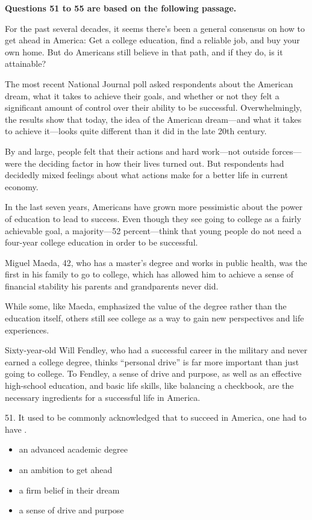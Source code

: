 \documentclass[UTF8,11pt]{ctexart}
\begin{document}
\textbf{Questions 51 to 55 are based on the following passage.}


For the past several decades, it seems there’s been a general consensus on how to get ahead in America: Get a college education, find a reliable job, and buy your own home. But do Americans still believe in that path, and if they do, is it attainable?


The most recent National Journal poll asked respondents about the American dream, what it takes to achieve their goals, and whether or not they felt a significant amount of control over their ability to be successful. Overwhelmingly, the results show that today, the idea of the American dream—and what it takes to achieve it—looks quite different than it did in the late 20th century.


By and large, people felt that their actions and hard work—not outside forces—were the deciding factor in how their lives turned out. But respondents had decidedly mixed feelings about what actions make for a better life in current economy.


In the last seven years, Americans have grown more pessimistic about the power of education to lead to success. Even though they see going to college as a fairly achievable goal, a majority—52 percent—think that young people do not need a four-year college education in order to be successful.


Miguel Maeda, 42, who has a master’s degree and works in public health, was the first in his family to go to college, which has allowed him to achieve a sense of financial stability his parents and grandparents never did.


While some, like Maeda, emphasized the value of the degree rather than the education itself, others still see college as a way to gain new perspectives and life experiences.


Sixty-year-old Will Fendley, who had a successful career in the military and never earned a college degree, thinks “personal drive” is far more important than just going to college. To Fendley, a sense of drive and purpose, as well as an effective high-school education, and basic life skills, like balancing a checkbook, are the necessary ingredients for a successful life in America.


51. It used to be commonly acknowledged that to succeed in America, one had to have .


\begin{itemize}[leftmargin=2em,itemsep=.2em,topsep=.4em]\item[A.] an advanced academic degree
\item[B.] an ambition to get ahead
\item[C.] a firm belief in their dream
\item[D.] a sense of drive and purpose
\end{itemize}
\end{document}
